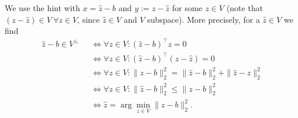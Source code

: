 {
\color{solution}
We use the hint with $x = \widehat{z}-b$ and $y:=z-\widehat{z}$ for some $z\in V$ (note that $(z-\widehat{z})\in V ~\forall z \in V$, since $\widehat{z}\in V$ and $V$ subspace). More precisely, for a $\widehat{z} \in V$ we find
\begin{align*}
 \widehat{z}-b \in V^\bot &~~~\Leftrightarrow\forall z \in V: (\widehat{z}-b)^\top z=0\\
  &~~~\Leftrightarrow \forall z\in V: (\widehat{z}-b)^\top (z-\widehat{z})=0\\
 &~~~\Leftrightarrow \forall z \in V:\|z-b\|_2^2 = \|\widehat{z}-b\|_2^2 +  \| \widehat{z}-z\|_2^2\\
 &~~~\Leftrightarrow \forall z \in V: \|\widehat{z}-b\|_2^2\leq \|z-b\|_2^2\\
 &~~~\Leftrightarrow  \widehat{z}= \arg\min_{z\in V} \|z-b\|_2^2 .
\end{align*}
}